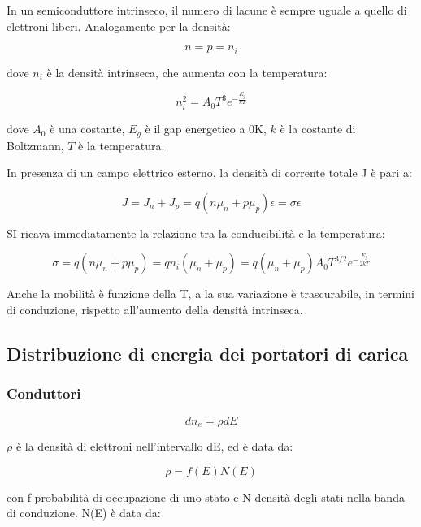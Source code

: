 \documentclass{article}
\begin{document}
In un semiconduttore intrinseco, il numero di lacune è sempre uguale a quello di elettroni liberi.
Analogamente per la densità:

\begin{equation}
    n = p = n_i
\end{equation}

dove $n_i$ è la densità intrinseca, che aumenta con la temperatura:

\begin{equation}
    n_i^2= A_0T^3 e^{-\frac{E_g}{kT}}
\end{equation}

dove $A_0$ è una costante, $E_g$ è il gap energetico a 0K, $k$ è la costante di Boltzmann, $T$ è la temperatura.

In presenza di un campo elettrico esterno, la densità di corrente totale J è pari a:

\begin{equation}
    J = J_n + J_p = q(n \mu_n + p \mu_p) \epsilon= \sigma \epsilon
\end{equation}

SI ricava immediatamente la relazione tra la conducibilità e la temperatura:

\begin{equation}
    \sigma= q(n \mu_n + p \mu_p)= qn_i(\mu_n + \mu_p)= q(\mu_n + \mu_p)A_0T^{3/2} e^{-\frac{E_g}{2kT}}
\end{equation}

Anche la mobilità è funzione della T, a la sua variazione è trascurabile, in termini di conduzione, rispetto all'aumento della densità intrinseca.

\subsection{Distribuzione di energia dei portatori di carica}
\subsubsection{Conduttori}
\begin{equation}
    d n_e= \rho dE
\end{equation}

$\rho$ è la densità di elettroni nell'intervallo dE, ed è data da:

\begin{equation}
    \rho = f(E) N(E)
\end{equation}

con f probabilità di occupazione di uno stato e N densità degli stati nella banda di conduzione.
N(E) è data da:
\end{document}
